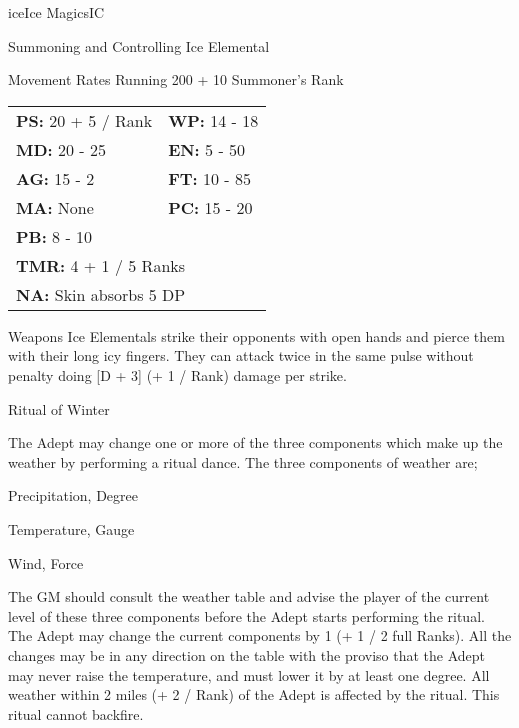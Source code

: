 \begin{college}[1.5]{ice}{Ice Magics}{IC}
\begin{ritual}[R-2]{Summoning and Controlling Ice Elemental}
\begin{effects}
\begin{Description}
\item[Movement Rates] Running 200 + 10 \x Summoner's Rank
\end{Description}
\begin{tabular}{ll}
\textbf{PS:} 20 + 5 / Rank	& \textbf{WP:} 14 - 18 \\
\textbf{MD:} 20 - 25		& \textbf{EN:} 5 - 50 \\
\textbf{AG:} 15 - 2		& \textbf{FT:} 10 - 85 \\
\textbf{MA:} None		& \textbf{PC:} 15 - 20 \\
\textbf{PB:} 8 - 10		& \\
\multicolumn{2}{l}{\textbf{TMR:} 4 + 1 / 5 Ranks} \\
\multicolumn{2}{l}{\textbf{NA:} Skin absorbs 5 DP} \\
\end{tabular}
\begin{Description}
\item[Weapons] Ice Elementals strike their opponents with open hands
and pierce them with their long icy fingers. They can attack twice in
the same pulse without penalty doing [D + 3] (+ 1 / Rank) damage per
strike.
\end{Description}
\end{effects}
\end{ritual}

\begin{ritual}[R-3]{Ritual of Winter}

\begin{effects}
The Adept may change one or more of the three components which make up
the weather by performing a ritual dance. The three components of
weather are;

\begin{Enumerate}
\item Precipitation, Degree
\item Temperature, Gauge
\item Wind, Force
\end{Enumerate}

The GM should consult the weather table and advise the player of the
current level of these three components before the Adept starts
performing the ritual. The Adept may change the current components by
1 (+ 1 / 2 full Ranks). All the changes may be in any direction on the
table with the proviso that the Adept may never raise the temperature,
and must lower it by at least one degree. All weather within 2 miles
(+ 2 / Rank) of the Adept is affected by the ritual. This ritual
cannot backfire.
\end{effects}
\end{ritual}


\end{college}

